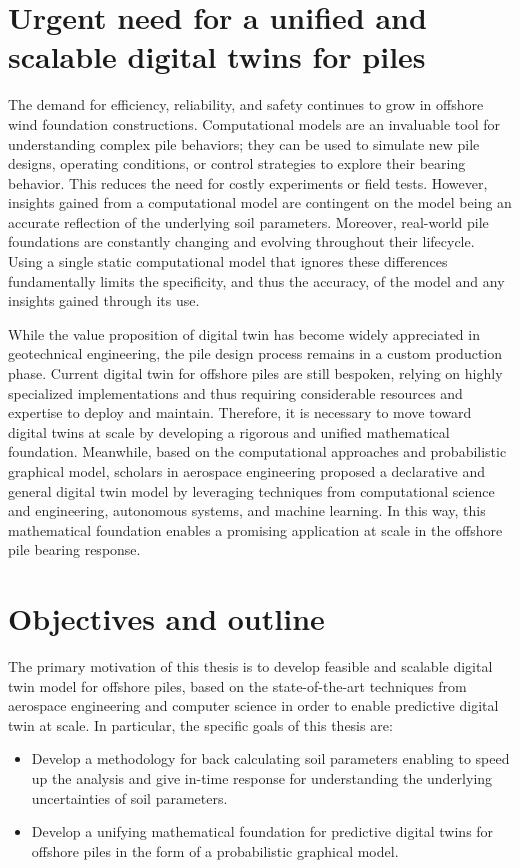 \section{Urgent need for a unified and scalable digital twins for piles}
The demand for efficiency, reliability, and safety continues to grow in offshore wind foundation constructions. Computational models are an invaluable tool
 for understanding complex pile behaviors; they can be used to simulate new pile designs, operating conditions, or control strategies to explore their bearing behavior. This reduces the need for costly experiments or field tests. However, insights gained from a computational model are contingent on the model being an accurate reflection of the underlying soil parameters. Moreover, real-world pile foundations are constantly changing and evolving throughout their lifecycle. Using a single static computational model that ignores these differences fundamentally limits the specificity,
 and thus the accuracy, of the model and any insights gained through its use.

 While the value proposition of digital twin has become widely appreciated in geotechnical engineering, the pile design process remains in a custom production phase. Current digital twin for offshore piles are still bespoken, relying on highly specialized implementations and thus requiring considerable resources and expertise to deploy and maintain. Therefore, it is necessary to move toward digital twins at scale by developing a rigorous and unified mathematical foundation. Meanwhile, based on the computational approaches and  probabilistic graphical model, scholars in aerospace engineering \citep{kapteyn2021} proposed a declarative and general digital twin model by leveraging techniques from computational science and engineering, autonomous systems, and machine learning. In this way, this mathematical foundation enables a promising application at scale in the offshore pile bearing response. 
 

 




\section{Objectives and outline}

The primary motivation of this thesis is to develop feasible and scalable digital twin model for offshore piles, based on the state-of-the-art techniques from aerospace engineering and computer science in order to enable predictive digital twin at scale. In particular, the specific goals of this thesis are:
\begin{itemize}
    \item Develop a methodology for back calculating soil parameters enabling to speed up the analysis and give in-time response for understanding the underlying uncertainties of soil parameters.
    \item Develop a unifying mathematical foundation for predictive digital twins for offshore piles in the form of a probabilistic graphical model.
\end{itemize}